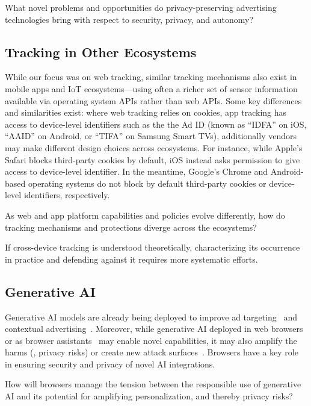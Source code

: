 \begin{opbox}
What novel problems and opportunities do privacy-preserving advertising technologies bring with respect to security, privacy, and autonomy?
\end{opbox}
\vspace{-3mm}


\subsection{Tracking in Other Ecosystems}
\vspace{-3mm}
While our focus was on web tracking, similar tracking mechanisms also exist in mobile apps and IoT ecosystems---using often a richer set of sensor information available via operating system APIs rather than web APIs. Some key differences and similarities exist: where web tracking relies on cookies, app tracking has access to device-level identifiers such as the the Ad ID (known as ``IDFA'' on iOS, ``AAID'' on Android, or ``TIFA'' on Samsung Smart TVs), additionally vendors may make different design choices across ecosystems. For instance, while Apple's Safari blocks third-party cookies by default, iOS instead asks permission  to give access to device-level identifier. In the meantime, Google's Chrome and Android-based operating systems do not block by default third-party cookies or device-level identifiers, respectively.  


\begin{opbox}
As web and app platform capabilities and policies evolve differently, how do tracking mechanisms and protections diverge across the ecosystems? 
\end{opbox}
\vspace{-2mm}

\begin{opbox}
If cross-device tracking is understood theoretically, characterizing its occurrence in practice and defending against it requires more systematic efforts.
\end{opbox}

\vspace{-2mm}
\subsection{Generative AI}
\vspace{-3mm}
Generative AI models are already being deployed to improve ad targeting~\cite{adv-week-genai-targeting} and contextual advertising~\cite{cognitiv2024cookieless}.
%
Moreover, while generative AI deployed in web browsers~\cite{google2024chromeai} or as browser assistants~\cite{vekaria2025big} may enable novel capabilities, it may also amplify the harms (\eg{}, privacy risks) or create new attack surfaces~\cite{mcp-security}. 
%
Browsers have a key role in ensuring security and privacy of novel AI integrations.

\begin{opbox}
How will browsers manage the tension between the responsible use of generative AI and its potential for amplifying personalization, and thereby privacy risks?
\end{opbox}